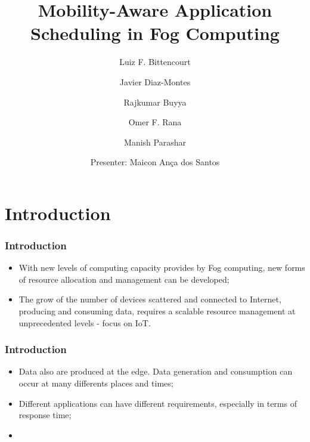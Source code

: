 \documentclass[10pt, pdf, xcolor=pdftex, dvipsnames, table]{beamer}
\title{Mobility-Aware Application Scheduling in Fog Computing}
\author{Luiz F. Bittencourt %
\and Javier Diaz-Montes %
\and Rajkumar Buyya %
\and Omer F. Rana
\and Manish Parashar
\newline
\newline
\and Presenter: Maicon Ança dos Santos
}
\begin{document}
\frame{\titlepage}



\section[Introduction]{Introduction}


\begin{frame}
	\frametitle{Introduction}
 	\begin{block}{}
 		\begin{itemize}
 			\item With new levels of computing capacity provides by Fog computing, new forms of resource allocation and management can be developed;
 			\newline
 		    \item The grow of the number of devices scattered and connected to Internet, producing and consuming data, requires a scalable resource management at unprecedented levels - focus on IoT.
 		\end{itemize}
 	\end{block}
\end{frame}

\begin{frame}
	\frametitle{Introduction}
 	\begin{block}{}
 		\begin{itemize}
 			\item Data also are produced at the edge. Data generation and consumption can occur at many differents places and times;
 			\newline
 		    \item Different applications can have different requirements, especially in terms of response time;
 		    \newline
 		    \item 
 		\end{itemize}
 	\end{block}
\end{frame}

\end{document}
